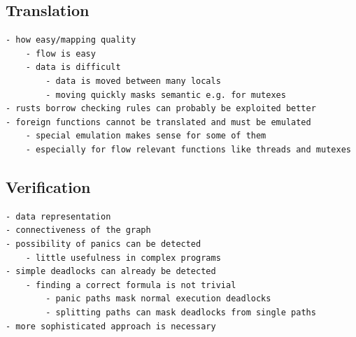 \subsection{Translation}

\begin{verbatim}
- how easy/mapping quality
    - flow is easy
    - data is difficult
        - data is moved between many locals
        - moving quickly masks semantic e.g. for mutexes
- rusts borrow checking rules can probably be exploited better
- foreign functions cannot be translated and must be emulated
    - special emulation makes sense for some of them
    - especially for flow relevant functions like threads and mutexes

\end{verbatim}

\subsection{Verification}
\begin{verbatim}
- data representation
- connectiveness of the graph
- possibility of panics can be detected
    - little usefulness in complex programs
- simple deadlocks can already be detected
    - finding a correct formula is not trivial
        - panic paths mask normal execution deadlocks
        - splitting paths can mask deadlocks from single paths
- more sophisticated approach is necessary
\end{verbatim}
